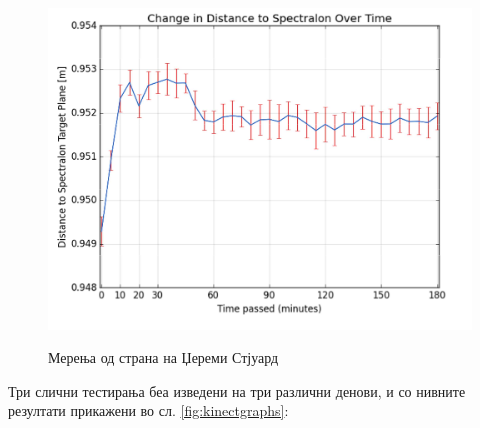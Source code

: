 \documentclass[11pt]{article}
\begin{document}
    \begin{figure}[H]
      \centering
      \includegraphics[width = 0.75\linewidth]{./images/heatup.png}
      \label{fig:heatup}
      \caption{Мерења од страна на Џереми Стјуард \cite{heatup}}
    \end{figure}

    Три слични тестирања беа изведени на три различни денови, и со нивните резултати прикажени во сл. \ref{fig:kinectgraphs}:
\end{document}
